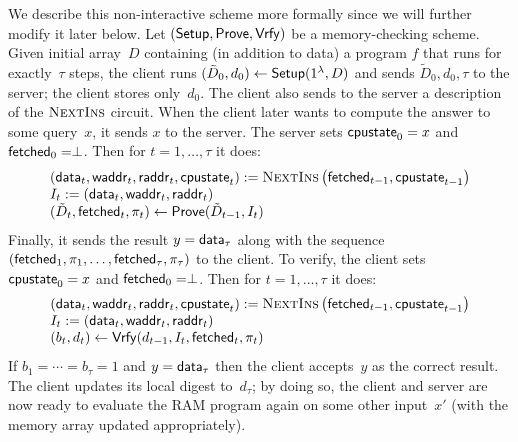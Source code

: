 We describe this non-interactive scheme more formally since we will further modify it later below.
Let $({\sf Setup}, {\sf Prove}, {\sf Vrfy})$ be a memory-checking scheme.
Given initial array~$D$ containing (in addition to data)
a program $f$ that runs for exactly~$\tau$
steps, the client
runs $(\tilde D_0, d_0) \leftarrow {\sf Setup}(1^\lambda, D)$ and sends $\tilde D_0, d_0, \tau$
to the server; the client stores only~$d_0$.
The client also sends to the server a description of 
the $\textsc{NextIns}$  circuit.
When the client later wants to compute the answer to some query~$x$, it sends $x$ to the server.
The server sets $\mathsf{cpustate}_0=x$ and ${\sf fetched}_0=\perp$. Then for $t=1, \ldots, \tau$ it
does:
\[
\begin{array}{l}
\left(\mathsf{data}_t, \mathsf{waddr}_{t}, \mathsf{raddr}_{t}, \mathsf{cpustate}_{t}\right)
  := \textsc{NextIns}\left({\sf fetched}_{t-1}, \mathsf{cpustate}_{t-1}\right)\\
I_t := (\mathsf{data}_t, \mathsf{waddr}_t, \mathsf{raddr}_t) \\
(\tilde D_t, {\sf fetched}_t, \pi_t) \leftarrow {\sf Prove}(\tilde{D}_{t-1}, I_t)
\end{array}
\]
Finally, it sends the result $y=\mathsf{data}_\tau$ along with the sequence
$({\sf fetched}_1, \pi_1, \ldots, {\sf fetched}_\tau, \pi_\tau)$ to the client.
To verify, the client sets $\mathsf{cpustate}_0=x$ and ${\sf fetched}_0=\perp$. Then for $t=1, \ldots, \tau$
it does:
\[
\begin{array}{l}
\left(\mathsf{data}_t, \mathsf{waddr}_{t}, \mathsf{raddr}_{t}, \mathsf{cpustate}_{t}\right)
  := \textsc{NextIns}\left({\sf fetched}_{t-1}, \mathsf{cpustate}_{t-1}\right)\\
I_t := (\mathsf{data}_t, \mathsf{waddr}_t, \mathsf{raddr}_t) \\
(b_t, d_t) \leftarrow {\sf Vrfy}(d_{t-1}, I_t, {\sf fetched}_t, \pi_t)
\end{array}
\]
If $b_1 = \cdots = b_\tau = 1$ and $y=\mathsf{data}_\tau$ then the client accepts~$y$ as the correct result.
The client updates its local digest to~$d_\tau$; by doing so, the client
and server are now ready to evaluate the RAM program again on some other input~$x'$ (with the memory
array updated appropriately).



